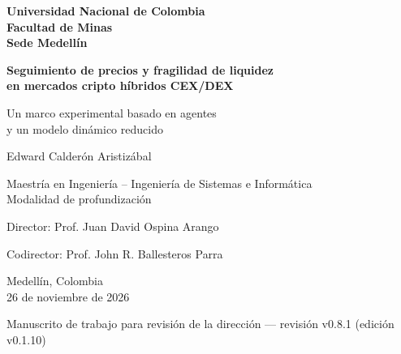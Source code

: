 \documentclass[11pt,letterpaper]{report}
\newcommand{\versionTesis}{v0.1.10}
\newcommand{\revisionManuscrito}{v0.8.1}
\numberwithin{equation}{chapter}
\begin{document}
\begin{titlepage}
  \thispagestyle{empty}
  \centering
  \singlespacing
  {\large\bfseries Universidad Nacional de Colombia\\[2pt]
  Facultad de Minas\\[2pt]
  Sede Medellín\par}
  \vspace{3.2cm}
  {\LARGE\bfseries Seguimiento de precios y fragilidad de liquidez\\
  en mercados cripto híbridos CEX/DEX\par}
  \vspace{0.9cm}
  {\Large Un marco experimental basado en agentes\\
  y un modelo dinámico reducido\par}
  \vspace{2.6cm}
  {\Large Edward Calderón Aristizábal\par}
  \vspace{1.6cm}
  {\large Maestría en Ingeniería -- Ingeniería de Sistemas e Informática\\[2pt]
  Modalidad de profundización\par}
  \vspace{0.8cm}
  {\large Director: Prof. Juan David Ospina Arango\par}
  {\large Codirector: Prof. John R. Ballesteros Parra\par}
  \vfill
  {\large Medellín, Colombia\\[2pt]
  26 de noviembre de 2026\par}
  \vspace{0.3cm}
  {\small Manuscrito de trabajo para revisión de la dirección --- revisión \revisionManuscrito{} (edición \versionTesis{})\par}
\end{titlepage}

\setcounter{page}{1}

\begingroup
\setcounter{secnumdepth}{-1}
\titleformat{\section}{\Large\bfseries}{}{0pt}{}
\singlespacing

\clearpage

\endgroup
\setcounter{secnumdepth}{2}
\end{document}
